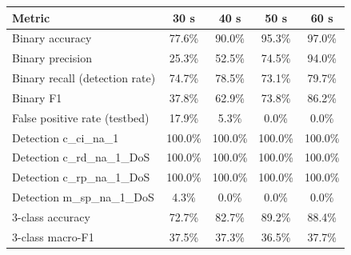 \begin{tabular}{lcccc}
\toprule
\textbf{Metric} & \textbf{30 s} & \textbf{40 s} & \textbf{50 s} & \textbf{60 s} \\
\midrule
Binary accuracy & 77.6\% & 90.0\% & 95.3\% & 97.0\% \\
Binary precision & 25.3\% & 52.5\% & 74.5\% & 94.0\% \\
Binary recall (detection rate) & 74.7\% & 78.5\% & 73.1\% & 79.7\% \\
Binary F1 & 37.8\% & 62.9\% & 73.8\% & 86.2\% \\
False positive rate (testbed) & 17.9\% & 5.3\% & 0.0\% & 0.0\% \\
Detection c\_ci\_na\_1 & 100.0\% & 100.0\% & 100.0\% & 100.0\% \\
Detection c\_rd\_na\_1\_DoS & 100.0\% & 100.0\% & 100.0\% & 100.0\% \\
Detection c\_rp\_na\_1\_DoS & 100.0\% & 100.0\% & 100.0\% & 100.0\% \\
Detection m\_sp\_na\_1\_DoS & 4.3\% & 0.0\% & 0.0\% & 0.0\% \\
3-class accuracy & 72.7\% & 82.7\% & 89.2\% & 88.4\% \\
3-class macro-F1 & 37.5\% & 37.3\% & 36.5\% & 37.7\% \\
\bottomrule
\end{tabular}
